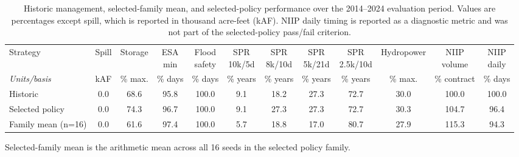 \begin{table}[htbp]
\centering
\caption{Historic management, selected-family mean, and selected-policy performance over the 2014--2024 evaluation period. Values are percentages except spill, which is reported in thousand acre-feet (kAF). NIIP daily timing is reported as a diagnostic metric and was not part of the selected-policy pass/fail criterion.}
\label{tab:selected-policy-comparison-with-historic}
\scriptsize
\setlength{\tabcolsep}{2.4pt}
\begin{tabular}{p{2.0cm}ccccccccccc}
\hline
Strategy & Spill & Storage & \shortstack{ESA\\min} & \shortstack{Flood\\safety} & \shortstack{SPR\\10k/5d} & \shortstack{SPR\\8k/10d} & \shortstack{SPR\\5k/21d} & \shortstack{SPR\\2.5k/10d} & Hydropower & \shortstack{NIIP\\volume} & \shortstack{NIIP\\daily} \\
\textit{Units/basis} & \multicolumn{1}{c}{kAF} & \multicolumn{1}{c}{\% max.} & \multicolumn{1}{c}{\% days} & \multicolumn{1}{c}{\% days} & \multicolumn{1}{c}{\% years} & \multicolumn{1}{c}{\% years} & \multicolumn{1}{c}{\% years} & \multicolumn{1}{c}{\% years} & \multicolumn{1}{c}{\% max.} & \multicolumn{1}{c}{\% contract} & \multicolumn{1}{c}{\% days} \\
\hline
Historic & 0.0 & 68.6 & 95.8 & 100.0 & 9.1 & 18.2 & 27.3 & 72.7 & 30.0 & 100.0 & 100.0 \\
Selected policy & 0.0 & 74.3 & 96.7 & 100.0 & 9.1 & 27.3 & 27.3 & 72.7 & 30.3 & 104.7 & 96.4 \\
Family mean (n=16) & 0.0 & 61.6 & 97.4 & 100.0 & 5.7 & 18.8 & 17.0 & 80.7 & 27.9 & 115.3 & 94.3 \\
\hline
\end{tabular}
\vspace{0.25em}\par\footnotesize{Selected-family mean is the arithmetic mean across all 16 seeds in the selected policy family.}
\end{table}
